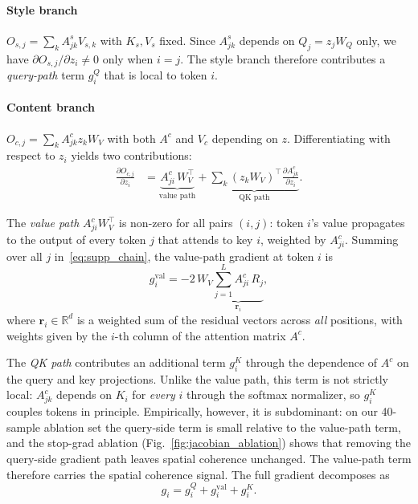 \paragraph{Style branch}
$O_{s,j} = \sum_k A_{jk}^s V_{s,k}$ with $K_s, V_s$ fixed.
Since $A_{jk}^s$ depends on $Q_j = z_j W_Q$ only, we have
$\partial O_{s,j}/\partial z_i \neq 0$ only when $i = j$.
The style branch therefore contributes a \emph{query-path} term $g_i^Q$ that
is local to token $i$.

\paragraph{Content branch}
$O_{c,j} = \sum_k A_{jk}^c z_k W_V$ with both $A^c$ and $V_c$ depending on $z$.
Differentiating with respect to $z_i$ yields two contributions:
\begin{align}
  \frac{\partial O_{c,j}}{\partial z_i}
  &= \underbrace{A_{ji}^c\, W_V^\top}_{\text{value path}}
   + \underbrace{\sum_k (z_k W_V)^\top \frac{\partial A_{jk}^c}{\partial z_i}}_{\text{QK path}}.
  \label{eq:supp_decomp}
\end{align}

The \emph{value path} $A_{ji}^c W_V^\top$ is non-zero for all pairs $(i,j)$:
token $i$'s value propagates to the output of every token $j$ that attends to
key $i$, weighted by $A_{ji}^c$.
Summing over all $j$ in~\eqref{eq:supp_chain}, the value-path gradient at
token $i$ is
\begin{equation}
  g_i^{\mathrm{val}}
  = -2\,W_V \underbrace{\sum_{j=1}^{L} A_{ji}^c\, R_j}_{\displaystyle\mathbf{r}_i},
  \label{eq:supp_gval}
\end{equation}
where $\mathbf{r}_i \in \mathbb{R}^d$ is a weighted sum of the residual vectors
across \emph{all} positions, with weights given by the $i$-th column of the
attention matrix $A^c$.

The \emph{QK path} contributes an additional term $g_i^K$ through the
dependence of $A^c$ on the query and key projections.
Unlike the value path, this term is not strictly local: $A_{jk}^c$ depends
on $K_i$ for \emph{every} $i$ through the softmax normalizer, so $g_i^K$
couples tokens in principle.
Empirically, however, it is subdominant: on our 40-sample ablation set the
query-side term is small relative to the value-path term, and the stop-grad
ablation (Fig.~\ref{fig:jacobian_ablation}) shows that removing the query-side
gradient path leaves spatial coherence unchanged.
The value-path term therefore carries the spatial coherence signal.
The full gradient decomposes as
\begin{equation}
  g_i = g_i^Q + g_i^{\mathrm{val}} + g_i^K.
  \label{eq:supp_full}
\end{equation}

